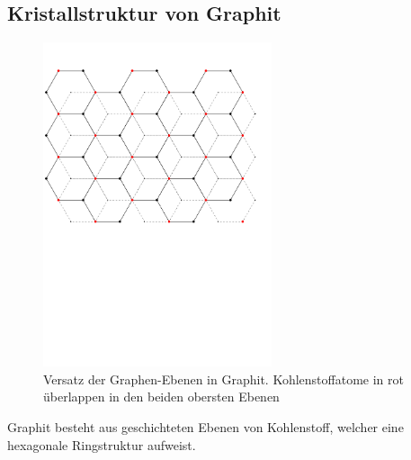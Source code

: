 \documentclass[10pt, a4paper]{article}
\begin{document}
\subsection{Kristallstruktur von Graphit}
\begin{figure}[h]
  \centering
  \includegraphics[width=0.6\textwidth]{grafiken/graphit.pdf}
  \caption{Versatz der Graphen-Ebenen in Graphit. Kohlenstoffatome in rot überlappen in den beiden obersten Ebenen}
\end{figure}
Graphit besteht aus geschichteten Ebenen von Kohlenstoff, welcher eine hexagonale Ringstruktur aufweist. 
\end{document}

